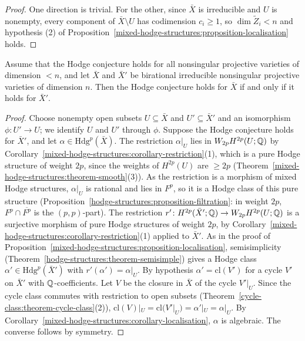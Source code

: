 \begin{proof}
One direction is trivial. For the other, since $\bar X$ is irreducible and $U$ is nonempty, every component of $\bar X \setminus U$ has codimension $c_i \geq 1$, so $\dim\tilde Z_i < n$ and hypothesis (2) of
Proposition~\ref{mixed-hodge-structures:proposition-localisation} holds.
\end{proof}

\begin{corollary}\label{mixed-hodge-structures:corollary-birational}
Assume that the Hodge conjecture holds for all nonsingular projective varieties of dimension $< n$, and let $\bar X$ and $\bar X'$ be birational irreducible nonsingular projective varieties of dimension $n$.
Then the Hodge conjecture holds for $\bar X$ if and only if it holds for $\bar X'$.
\end{corollary}

\begin{proof}
Choose nonempty open subsets $U \subseteq \bar X$ and $U' \subseteq \bar X'$ and an isomorphism $\phi \colon U' \to U$; we identify $U$ and $U'$ through $\phi$. Suppose the Hodge conjecture holds for
$\bar X'$, and let $\alpha \in \mathrm{Hdg}^p(\bar X)$. The restriction $\alpha|_U$ lies in $W_{2p}H^{2p}(U; \mathbb{Q})$ by Corollary~\ref{mixed-hodge-structures:corollary-restriction}(1), which is a pure Hodge
structure of weight $2p$, since the weights of $H^{2p}(U)$ are $\geq 2p$ (Theorem~\ref{mixed-hodge-structures:theorem-smooth}(3)). As the restriction is a morphism of mixed Hodge structures, $\alpha|_U$ is
rational and lies in $F^p$, so it is a Hodge class of this pure structure (Proposition~\ref{hodge-structures:proposition-filtration}: in weight $2p$, $F^p \cap \overline{F^p}$ is the $(p,p)$-part). The restriction
$r' \colon H^{2p}(\bar X'; \mathbb{Q}) \to W_{2p}H^{2p}(U; \mathbb{Q})$ is a surjective morphism of pure Hodge structures of weight $2p$, by Corollary~\ref{mixed-hodge-structures:corollary-restriction}(1) applied to $\bar X'$.
As in the proof of Proposition~\ref{mixed-hodge-structures:proposition-localisation}, semisimplicity (Theorem~\ref{hodge-structures:theorem-semisimple}) gives a Hodge class $\alpha' \in \mathrm{Hdg}^p(\bar X')$ with
$r'(\alpha') = \alpha|_U$. By hypothesis $\alpha' = \mathrm{cl}(V')$ for a cycle $V'$ on $\bar X'$ with $\mathbb{Q}$-coefficients. Let $V$ be the closure in $\bar X$ of the cycle $V'|_U$. Since the cycle class
commutes with restriction to open subsets (Theorem~\ref{cycle-class:theorem-cycle-class}(2)), $\mathrm{cl}(V)|_U = \mathrm{cl}(V'|_U) = \alpha'|_U = \alpha|_U$. By
Corollary~\ref{mixed-hodge-structures:corollary-localisation}, $\alpha$ is algebraic. The converse follows by symmetry.
\end{proof}

